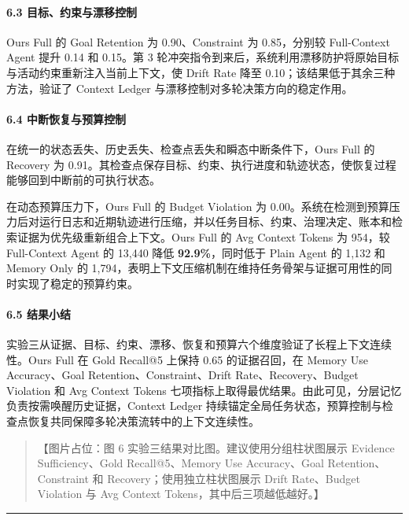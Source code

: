 \documentclass[UTF8,a4paper,12pt]{ctexart}
\begin{document}
\paragraph{6.3 目标、约束与漂移控制}

Ours Full 的 Goal Retention 为 0.90、Constraint 为 0.85，分别较 Full-Context Agent 提升 0.14 和 0.15。第 3 轮冲突指令到来后，系统利用漂移防护将原始目标与活动约束重新注入当前上下文，使 Drift Rate 降至 0.10；该结果低于其余三种方法，验证了 Context Ledger 与漂移控制对多轮决策方向的稳定作用。

\paragraph{6.4 中断恢复与预算控制}

在统一的状态丢失、历史丢失、检查点丢失和瞬态中断条件下，Ours Full 的 Recovery 为 0.91。其检查点保存目标、约束、执行进度和轨迹状态，使恢复过程能够回到中断前的可执行状态。

在动态预算压力下，Ours Full 的 Budget Violation 为 0.00。系统在检测到预算压力后对运行日志和近期轨迹进行压缩，并以任务目标、约束、治理决定、账本和检索证据为优先级重新组合上下文。Ours Full 的 Avg Context Tokens 为 954，较 Full-Context Agent 的 13,440 降低 \textbf{92.9\%}，同时低于 Plain Agent 的 1,132 和 Memory Only 的 1,794，表明上下文压缩机制在维持任务骨架与证据可用性的同时实现了稳定的预算约束。

\paragraph{6.5 结果小结}

实验三从证据、目标、约束、漂移、恢复和预算六个维度验证了长程上下文连续性。Ours Full 在 Gold Recall@5 上保持 0.65 的证据召回，在 Memory Use Accuracy、Goal Retention、Constraint、Drift Rate、Recovery、Budget Violation 和 Avg Context Tokens 七项指标上取得最优结果。由此可见，分层记忆负责按需唤醒历史证据，Context Ledger 持续锚定全局任务状态，预算控制与检查点恢复共同保障多轮决策流转中的上下文连续性。

\begin{quote}
【图片占位：图 6 实验三结果对比图。建议使用分组柱状图展示 Evidence Sufficiency、Gold Recall@5、Memory Use Accuracy、Goal Retention、Constraint 和 Recovery；使用独立柱状图展示 Drift Rate、Budget Violation 与 Avg Context Tokens，其中后三项越低越好。】
\end{quote}

\begin{center}\rule{0.5\linewidth}{0.5pt}\end{center}
\end{document}
